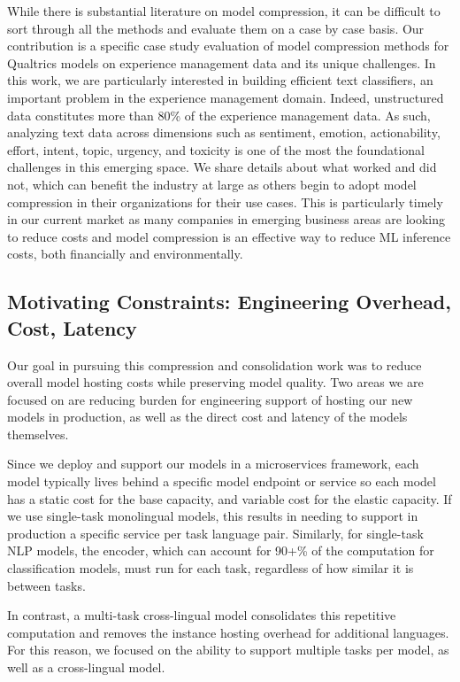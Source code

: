 While there is substantial literature on model compression, it can be difficult to sort through all the methods and evaluate them on a case by case basis.
Our contribution is a specific case study evaluation of model compression methods for Qualtrics models on experience management data and its unique challenges.
In this work, we are particularly interested in building efficient text classifiers, an important problem in the experience management domain. 
Indeed, unstructured data constitutes more than 80\% of the experience management data.
As such, analyzing text data across dimensions such as sentiment, emotion, actionability, effort, intent, topic, urgency, and toxicity is one of the most the foundational challenges in this emerging space. 
We share details about what worked and did not, which can benefit the industry at large as others begin to adopt model compression in their organizations for their use cases.
This is particularly timely in our current market as many companies in emerging business areas are looking to reduce costs and model compression is an effective way to reduce ML inference costs, both financially and environmentally.
\subsection{Motivating Constraints: Engineering Overhead, Cost, Latency}
Our goal in pursuing this compression and consolidation work was to reduce overall model hosting costs while preserving model quality.
Two areas we are focused on are reducing burden for engineering support of hosting our new models in production, as well as the direct cost and latency of the models themselves.

Since we deploy and support our models in a microservices framework, each model typically lives behind a specific model endpoint or service so each model has a static cost for the base capacity, and variable cost for the elastic capacity.
If we use single-task monolingual models, this results in needing to support in production a specific service per task language pair.
Similarly, for single-task NLP models, the encoder, which can account for 90+\% of the computation for classification models, must run for each task, regardless of how similar it is between tasks.

In contrast, a multi-task cross-lingual model consolidates this repetitive computation and removes the instance hosting overhead for additional languages.
For this reason, we focused on the ability to support multiple tasks per model, as well as a cross-lingual model.

